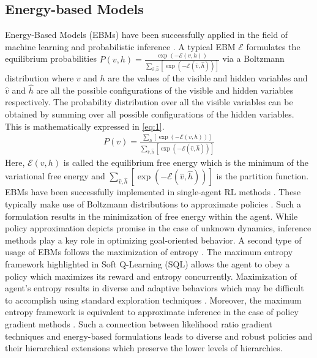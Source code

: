 \documentclass{article}
\begin{document}
\begin{multicols}{2}
\subsection{Energy-based Models}
Energy-Based Models (EBMs) \cite{ebm,ebmdoc} have been successfully applied in the field of machine learning \cite{energy} and probabilistic inference \cite{david}. A typical EBM $\mathcal{E}$ formulates the equilibrium probabilities \cite{rlhinton} $P(v,h) = \frac{\exp{(-\mathcal{E}(v,h))}}{\sum_{\hat{v},\hat{h}}[\exp{(-\mathcal{E}(\hat{v},\hat{h}))}]}$ via a Boltzmann distribution \cite{boltzmann} where $v$ and $h$ are the values of the visible and hidden variables and $\hat{v}$ and $\hat{h}$ are all the possible configurations of the visible and hidden variables respectively. The probability distribution over all the visible variables can be obtained by summing over all possible configurations of the hidden variables. This is mathematically expressed in \autoref{eq:1}.
\begin{gather}
    P(v) = \frac{\sum_{h}[\exp{(-\mathcal{E}(v,h))}]}{\sum_{\hat{v},\hat{h}}[\exp{(-\mathcal{E}(\hat{v},\hat{h}))}]} \label{eq:1}    
\end{gather}
Here, $\mathcal{E}(v,h)$ is called the equilibrium free energy which is the minimum of the variational free energy and $\sum_{\hat{v},\hat{h}}[\exp{(-\mathcal{E}(\hat{v},\hat{h}))}]$ is the partition function. EBMs have been successfully implemented in single-agent RL methods \cite{pgq,sql}. These typically make use of Boltzmann distributions to approximate policies \cite{boltzmann}. Such a formulation results in the minimization of free energy within the agent. While policy approximation depicts promise in the case of unknown dynamics, inference methods \cite{inference} play a key role in optimizing goal-oriented behavior. A second type of usage of EBMs follows the maximization of entropy \cite{ziebartinverse}. The maximum entropy framework \cite{sac} highlighted in Soft Q-Learning (SQL) \cite{sql} allows the agent to obey a policy which maximizes its reward and entropy concurrently. Maximization of agent's entropy results in diverse and adaptive behaviors \cite{ziebartphd} which may be difficult to accomplish using standard exploration techniques \cite{curiosity,exploration}. Moreover, the maximum entropy framework is equivalent to approximate inference in the case of policy gradient methods \cite{equivalence}. Such a connection between likelihood ratio gradient techniques and energy-based formulations leads to diverse and robust policies \cite{haarnoja} and their hierarchical extensions \cite{hierarchical} which preserve the lower levels of hierarchies.


\end{multicols}
\end{document}
